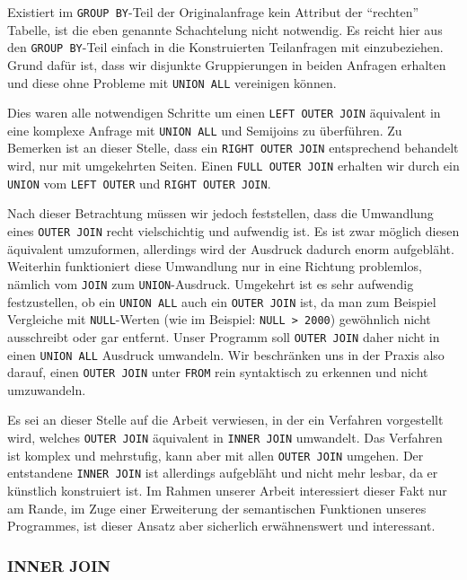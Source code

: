 Existiert im \verb|GROUP BY|-Teil der Originalanfrage kein Attribut der ``rechten'' Tabelle, ist die eben genannte Schachtelung nicht notwendig. Es reicht hier aus den \verb|GROUP BY|-Teil einfach in die Konstruierten Teilanfragen mit einzubeziehen. Grund dafür ist, dass wir disjunkte Gruppierungen in beiden Anfragen erhalten und diese ohne Probleme mit \verb|UNION ALL| vereinigen können.

Dies waren alle notwendigen Schritte um einen \verb|LEFT OUTER JOIN| äquivalent in eine komplexe Anfrage mit \verb|UNION ALL| und Semijoins zu überführen. Zu Bemerken ist an dieser Stelle, dass ein \verb|RIGHT OUTER JOIN| entsprechend behandelt wird, nur mit umgekehrten Seiten. Einen \verb|FULL OUTER JOIN| erhalten wir durch ein \verb|UNION| vom \verb|LEFT OUTER| und \verb|RIGHT OUTER JOIN|. 

Nach dieser Betrachtung müssen wir jedoch feststellen, dass die Umwandlung eines \verb|OUTER JOIN| recht vielschichtig und aufwendig ist. Es ist zwar möglich diesen äquivalent umzuformen, allerdings wird der Ausdruck dadurch enorm aufgebläht. Weiterhin funktioniert diese Umwandlung nur in eine Richtung problemlos, nämlich vom \verb|JOIN| zum \verb|UNION|-Ausdruck. Umgekehrt ist es sehr aufwendig festzustellen, ob ein \verb|UNION ALL| auch ein \verb|OUTER JOIN| ist, da man zum Beispiel Vergleiche mit \verb|NULL|-Werten (wie im Beispiel: \verb|NULL > 2000|) gewöhnlich nicht ausschreibt oder gar entfernt. Unser Programm soll \verb|OUTER JOIN| daher nicht in einen \verb|UNION ALL| Ausdruck umwandeln. Wir beschränken uns in der Praxis also darauf, einen \verb|OUTER JOIN| unter \verb|FROM| rein syntaktisch zu erkennen und nicht umzuwandeln. 

Es sei an dieser Stelle auf die Arbeit \cite{outer2inner} verwiesen, in der ein Verfahren vorgestellt wird, welches \verb|OUTER JOIN| äquivalent in \verb|INNER JOIN| umwandelt. Das Verfahren ist komplex und mehrstufig, kann aber mit allen \verb|OUTER JOIN| umgehen. Der entstandene \verb|INNER JOIN| ist allerdings aufgebläht und nicht mehr lesbar, da er künstlich konstruiert ist. Im Rahmen unserer Arbeit interessiert dieser Fakt nur am Rande, im Zuge einer Erweiterung der semantischen Funktionen unseres Programmes, ist dieser Ansatz aber sicherlich erwähnenswert und interessant.

\subsubsection*{INNER JOIN}

